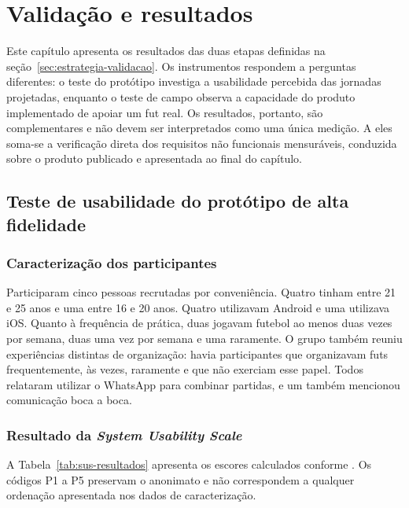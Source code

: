 \chapter{Validação e resultados}
\label{cap:validacao-resultados}

Este capítulo apresenta os resultados das duas etapas definidas na seção~\ref{sec:estrategia-validacao}. Os instrumentos respondem a perguntas diferentes: o teste do protótipo investiga a usabilidade percebida das jornadas projetadas, enquanto o teste de campo observa a capacidade do produto implementado de apoiar um fut real. Os resultados, portanto, são complementares e não devem ser interpretados como uma única medição. A eles soma-se a verificação direta dos requisitos não funcionais mensuráveis, conduzida sobre o produto publicado e apresentada ao final do capítulo.

\section{Teste de usabilidade do protótipo de alta fidelidade}

    \subsection{Caracterização dos participantes}

        Participaram cinco pessoas recrutadas por conveniência. Quatro tinham entre 21 e 25 anos e uma entre 16 e 20 anos. Quatro utilizavam Android e uma utilizava iOS. Quanto à frequência de prática, duas jogavam futebol ao menos duas vezes por semana, duas uma vez por semana e uma raramente. O grupo também reuniu experiências distintas de organização: havia participantes que organizavam futs frequentemente, às vezes, raramente e que não exerciam esse papel. Todos relataram utilizar o WhatsApp para combinar partidas, e um também mencionou comunicação boca a boca.

    \subsection{Resultado da \textit{System Usability Scale}}

        A Tabela~\ref{tab:sus-resultados} apresenta os escores calculados conforme . Os códigos P1 a P5 preservam o anonimato e não correspondem a qualquer ordenação apresentada nos dados de caracterização.


